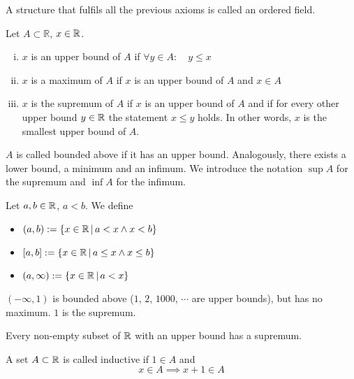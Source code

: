 \documentclass[../../script.tex]{subfiles}
\begin{document}
\begin{rem}
A structure that fulfils all the  previous axioms is called an ordered field.
\end{rem}

\begin{defi}
Let $A \subset \mathbb{R}$, $x \in \mathbb{R}$.
\begin{enumerate}[(i)]
	\item $x$ is an upper bound of $A$ if $\forall y \in A: \quad y \le x$
	
	\item $x$ is a maximum of $A$ if $x$ is an upper bound of $A$ and $x \in A$
	
	\item $x$ is the supremum of $A$ if $x$ is an upper bound of $A$ and if for every other upper bound $y \in \mathbb{R}$ the statement $x \le y$ holds. In other words, $x$ is the smallest upper bound of $A$.
\end{enumerate}
$A$ is called bounded above if it has an upper bound. Analogously, there exists a lower bound, a minimum and an infimum. We introduce the notation $\sup A$ for the supremum and $\inf A$ for the infimum.
\end{defi}

\begin{defi}
Let $a, b \in \mathbb{R}$, $a < b$. We define
\begin{itemize}
	\item $(a, b) := \{x \in \mathbb{R} \,\vert\, a < x \wedge x < b\}$
	
	\item $[a, b] := \{x \in \mathbb{R} \,\vert\, a \le x \wedge x \le b\}$
	
	\item $(a, \infty) := \{x \in \mathbb{R} \,\vert\, a < x\}$
\end{itemize}
\end{defi}

\begin{eg}
	$(-\infty, 1)$ is bounded above ($1$, $2$, $1000$, $\cdots$ are upper bounds), but has no maximum. $1$ is the supremum.
\end{eg}

\begin{defi}
Every non-empty subset of $\mathbb{R}$ with an upper bound has a supremum.
\end{defi}

\begin{defi}
A set $A \subset \mathbb{R}$ is called inductive if $1 \in A$ and 
\[
	x \in A \implies x + 1 \in A
\]
\end{defi}
\end{document}
